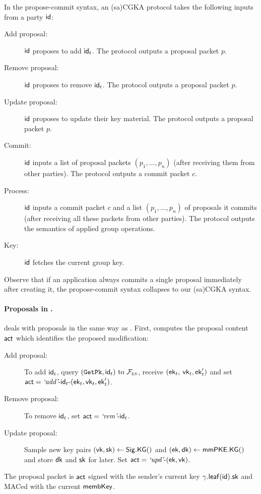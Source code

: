 In the propose-commit syntax, an (sa)CGKA protocol takes the following inputs from a party ${\mathsf{id}}$:
\begin{description}
	\item[Add proposal:] ${\mathsf{id}}$ proposes to add ${\mathsf{id}}_t$. The protocol outputs a proposal packet $p$.
	\item[Remove proposal:] ${\mathsf{id}}$ proposes to remove ${\mathsf{id}}_t$. The protocol outputs a proposal packet $p$.
	\item[Update proposal:] ${\mathsf{id}}$ proposes to update their key material. The protocol outputs a proposal packet $p$.
	\item[Commit:] ${\mathsf{id}}$ inputs a list of proposal packets $(p_1, \dots, p_n)$ (after receiving them from other parties). The protocol outputs a commit packet $c$.
	\item[Process:] ${\mathsf{id}}$ inputs a commit packet $c$ and a list $(p_1, \dots, p_n)$ of proposals it commits (after receiving all these packets from other parties). The protocol outputs the semantics of applied group operations.
	\item[Key:] ${\mathsf{id}}$ fetches the current group key.
\end{description}

Observe that if an application always commits a single proposal immediately after creating it, the propose-commit syntax collapses to our (sa)CGKA syntax.

\paragraph{Proposals in \saik.}
\saik deals with proposals in the same way as \protITK. First, computes the proposal content $\mathsf{act}$ which identifies the proposed modification:
\begin{description}
	\item[Add proposal:] To add ${\mathsf{id}}_t$, query $({\normalfont\texttt{GetPk}},{\mathsf{id}}_t) \text{ to } \mathcal{F}_{\normalfont\textsc{ks}}$, receive $({\mathsf{ek}}_t, $ ${\mathsf{vk}}_t, {\mathsf{ek}}_t')$ and set $\mathsf{act} = {\text{\normalfont \it`add'}}\textrm{-}{\ensuremath{\mathsf{id}}}_t\textrm{-}({\mathsf{ek}}_t, {\mathsf{vk}}_t, {\mathsf{ek}}_t')$.
	\item[Remove proposal:] To remove ${\mathsf{id}}_t$, set $\mathsf{act} = {\text{\normalfont \it`rem'}}\textrm{-}{\ensuremath{\mathsf{id}}}_t$.
	\item[Update proposal:] Sample new key pairs  $({\mathsf{vk}}, {\mathsf{sk}}) \gets {\ensuremath{\mathsf{Sig}}}.{\mathsf{KG}}()$ and $({\mathsf{ek}}, {\mathsf{dk}}) \gets {\ensuremath{\mathsf{mmPKE}}}.{\mathsf{KG}}()$ and store ${\mathsf{dk}}$ and ${\mathsf{sk}}$ for later. Set $\mathsf{act} = {\text{\normalfont \it`upd'}}\textrm{-}({\mathsf{ek}}, {\mathsf{vk}})$.
\end{description}
The proposal packet is $\mathsf{act}$ signed with the sender's current key $\gamma.{\mathsf{leaf}}({\mathsf{id}}).{\mathsf{sk}}$ and MACed with the current ${\mathsf{membKey}}$.

